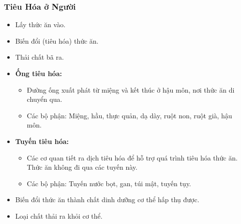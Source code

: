 \documentclass[Main.tex]{subfiles}
\begin{document}
\subsubsection{Tiêu Hóa ở Người}
    \begin{itemize}
        \item Lấy thức ăn vào.
        \item Biến đổi (tiêu hóa) thức ăn.
        \item Thải chất bã ra.
    \end{itemize}
    \begin{itemize}
        \item \textbf{Ống tiêu hóa:}
            \begin{itemize}
                \item Đường ống xuất phát từ miệng và kết thúc ở hậu môn, nơi thức ăn di chuyển qua.
                \item Các bộ phận: Miệng, hầu, thực quản, dạ dày, ruột non, ruột già, hậu môn.
            \end{itemize}
        \item \textbf{Tuyến tiêu hóa:}
            \begin{itemize}
                \item Các cơ quan tiết ra dịch tiêu hóa để hỗ trợ quá trình tiêu hóa thức ăn. Thức ăn không đi qua các tuyến này.
                \item Các bộ phận: Tuyến nước bọt, gan, túi mật, tuyến tụy.
            \end{itemize}
    \end{itemize}
    \begin{itemize}
        \item Biến đổi thức ăn thành chất dinh dưỡng cơ thể hấp thụ được.
        \item Loại chất thải ra khỏi cơ thể.
    \end{itemize}
\end{document}
